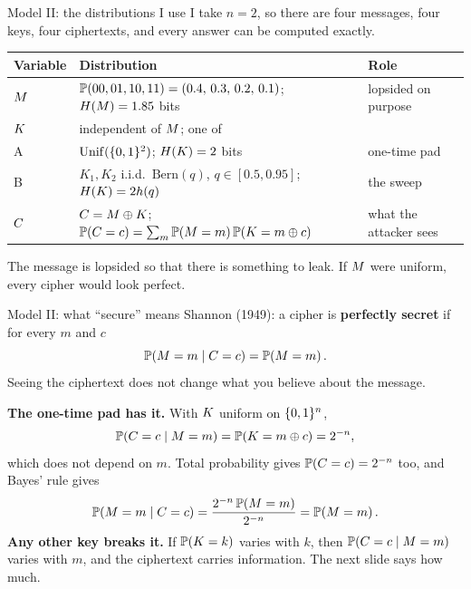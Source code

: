 \documentclass[10pt,aspectratio=169]{beamer}
\newcommand{\Bern}{\mathrm{Bern}}
\newcommand{\Unif}{\mathrm{Unif}}
\begin{document}
\begin{frame}{Model II: the distributions I use}
  I take $n = 2$, so there are four messages, four keys, four
  ciphertexts, and every answer can be computed exactly.
  \begin{center}\footnotesize
    \begin{tabular}{@{}lll@{}}
      \toprule
      Variable & Distribution & Role \\
      \midrule
      $M$ & $\mathbb{P}\!\left(00,01,10,11\right) = (0.4,\,0.3,\,0.2,\,0.1)$;
               $H\!\left(M\right) = 1.85$ bits & lopsided on purpose \\
      \addlinespace
      $K$ & independent of $M$; one of & \\
      \quad A & $\Unif(\bits^2)$; $H\!\left(K\right) = 2$ bits & one-time pad \\
      \quad B & $K_1,K_2$ i.i.d.\ $\Bern(q)$, $q\in[0.5,0.95]$;
                $H\!\left(K\right)=2h(q)$ & the sweep \\
      \addlinespace
      $C$ & $C = M\oplus K$;\;
                $\mathbb{P}\!\left(C=c\right) = \sum_m \mathbb{P}\!\left(M=m\right)\mathbb{P}\!\left(K=m\oplus c\right)$
              & what the attacker sees \\
      \bottomrule
    \end{tabular}
  \end{center}
  \medskip
  The message is lopsided so that there is something to leak. If
  $M$ were uniform, every cipher would look perfect.
\end{frame}

\begin{frame}{Model II: what ``secure'' means}
  Shannon (1949): a cipher is \textbf{perfectly secret} if for every
  $m$ and $c$
  \[
    \mathbb{P}\!\left(M = m \mid C = c\right) = \mathbb{P}\!\left(M = m\right).
  \]
  Seeing the ciphertext does not change what you believe about the
  message.
  \pause
  \medskip

  \textbf{The one-time pad has it.} With $K$ uniform on $\{0,1\}^n$,
  \[
    \mathbb{P}\!\left(C = c \mid M = m\right) = \mathbb{P}\!\left(K = m \oplus c\right) = 2^{-n},
  \]
  which does not depend on $m$. Total probability gives
  $\mathbb{P}\!\left(C = c\right) = 2^{-n}$ too, and Bayes' rule gives
  \[
    \mathbb{P}\!\left(M = m \mid C = c\right)
      = \frac{2^{-n}\,\mathbb{P}\!\left(M = m\right)}{2^{-n}} = \mathbb{P}\!\left(M = m\right).
  \]
  \pause
  \textbf{Any other key breaks it.} If $\mathbb{P}\!\left(K = k\right)$ varies with
  $k$, then $\mathbb{P}\!\left(C = c \mid M = m\right)$ varies with $m$, and the
  ciphertext carries information. The next slide says how much.
\end{frame}
\end{document}
